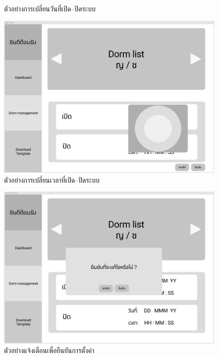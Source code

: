 \begin{enumerate}
\begin{figure}[h]
\begin{center}
  \end{center}
  \caption{ตัวอย่างการเปลี่ยนวันที่เปิด--ปิดระบบ}
  \label{fig:datepicker}
  \end{figure}
  \begin{figure}[h]
  \begin{center}
  \includegraphics[width=\linewidth]{photo/timepicker.png}
  \end{center}
  \caption{ตัวอย่างการเปลี่ยนเวลาที่เปิด--ปิดระบบ}
  \label{fig:timepicker}
  \end{figure}
  \begin{figure}[h]
  \begin{center}
  \includegraphics[width=\linewidth]{photo/confirmation.png}
  \end{center}
  \caption{ตัวอย่างแจ้งเตือนเพื่อยืนยันการตั้งค่า}
  \label{fig:confirm-date-time}
  \end{figure}


\end{enumerate}
